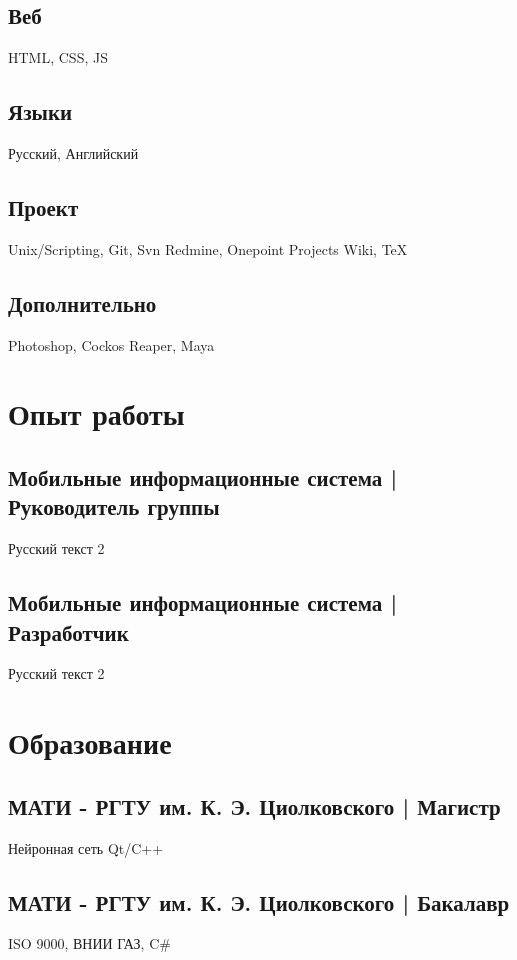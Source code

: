 \documentclass[a4paper]{curricula-vitae}
\begin{document}
\begin{minipage}[t]{0.33\textwidth}
\subsection{Веб}
HTML, CSS, JS

\subsection{Языки}
Русский, Английский

\subsection{Проект}
Unix/Scripting, Git, Svn
Redmine, Onepoint Projects
Wiki, TeX

\subsection{Дополнительно}
Photoshop, 
Cockos Reaper, 
Maya

\end{minipage} %
\hfill
\begin{minipage}[t]{0.66\textwidth} %

\section{Опыт работы} 

\subsection{Мобильные информационные система | Руководитель группы}
Русский текст 2

\subsection{Мобильные информационные система | Разработчик}
Русский текст 2

\section{Образование} 

\subsection{МАТИ - РГТУ им. К. Э. Циолковского | Магистр}
Нейронная сеть Qt/C++

\subsection{МАТИ - РГТУ им. К. Э. Циолковского | Бакалавр}
ISO 9000, ВНИИ ГАЗ, C\#

\end{minipage} %

\end{document}
